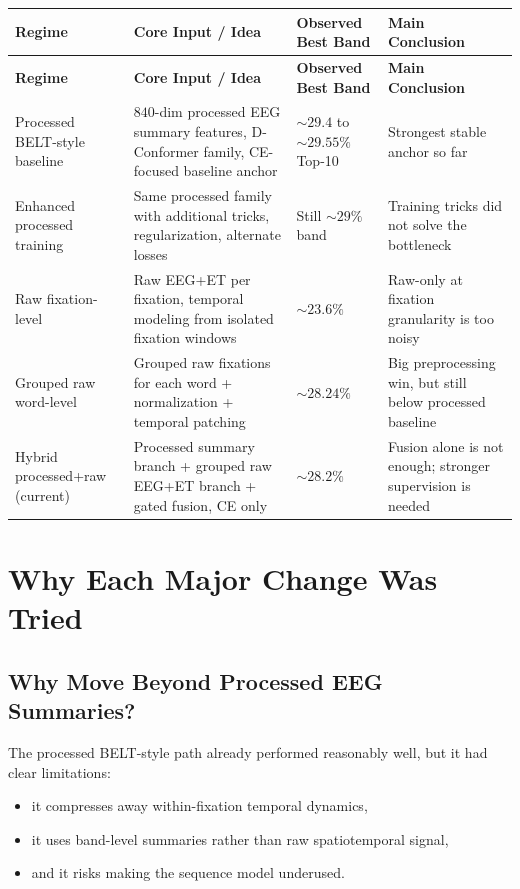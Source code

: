 \documentclass[11pt]{article}
\begin{document}
\begin{longtable}{p{3.2cm}p{4.8cm}p{3.0cm}p{3.6cm}}
\toprule
\textbf{Regime} & \textbf{Core Input / Idea} & \textbf{Observed Best Band} & \textbf{Main Conclusion} \\
\midrule
\endfirsthead
\toprule
\textbf{Regime} & \textbf{Core Input / Idea} & \textbf{Observed Best Band} & \textbf{Main Conclusion} \\
\midrule
\endhead
Processed BELT-style baseline & \(840\)-dim processed EEG summary features, D-Conformer family, CE-focused baseline anchor & \(\sim 29.4\) to \(\sim 29.55\%\) Top-10 & Strongest stable anchor so far \\
Enhanced processed training & Same processed family with additional tricks, regularization, alternate losses & Still \(\sim 29\%\) band & Training tricks did not solve the bottleneck \\
Raw fixation-level & Raw EEG+ET per fixation, temporal modeling from isolated fixation windows & \(\sim 23.6\%\) & Raw-only at fixation granularity is too noisy \\
Grouped raw word-level & Grouped raw fixations for each word + normalization + temporal patching & \(\sim 28.24\%\) & Big preprocessing win, but still below processed baseline \\
Hybrid processed+raw (current) & Processed summary branch + grouped raw EEG+ET branch + gated fusion, CE only & \(\sim 28.2\%\) & Fusion alone is not enough; stronger supervision is needed \\
\bottomrule
\end{longtable}

\section{Why Each Major Change Was Tried}

\subsection{Why Move Beyond Processed EEG Summaries?}

The processed BELT-style path already performed reasonably well, but it had clear limitations:
\begin{itemize}
    \item it compresses away within-fixation temporal dynamics,
    \item it uses band-level summaries rather than raw spatiotemporal signal,
    \item and it risks making the sequence model underused.
\end{itemize}
\end{document}
